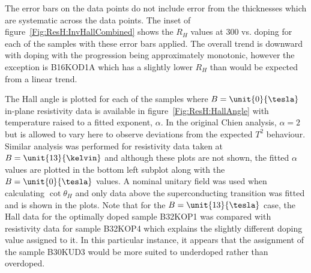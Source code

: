 The error bars on the data points do not include error from the thicknesses which are systematic across the data points. The inset of figure~\ref{Fig:ResH:InvHallCombined} shows the $R_H$ values at \unit{300}{\kelvin} vs. doping for each of the samples with these error bars applied. The overall trend is downward with doping with the progression being approximately monotonic, however the exception is B16KOD1A which has a slightly lower $R_H$ than would be expected from a linear trend.

The Hall angle is plotted for each of the samples where $B=\unit{0}{\tesla}$ in-plane resistivity data is available in figure~\ref{Fig:ResH:HallAngle} with temperature raised to a fitted exponent, $\alpha$. In the original Chien analysis, $\alpha = 2$ but is allowed to vary here to observe deviations from the expected $T^2$ behaviour. Similar analysis was performed for resistivity data taken at $B=\unit{13}{\kelvin}$ and although these plots are not shown, the fitted $\alpha$ values are plotted in the bottom left subplot along with the $B=\unit{0}{\tesla}$ values. A nominal unitary field was used when calculating $\cot\theta_H$ and only data above the superconducting transition was fitted and is shown in the plots. Note that for the $B=\unit{13}{\tesla}$ case, the Hall data for the optimally doped sample B32KOP1 was compared with resistivity data for sample B32KOP4 which explains the slightly different doping value assigned to it. In this particular instance, it appears that the assignment of the sample B30KUD3 would be more suited to underdoped rather than overdoped.

